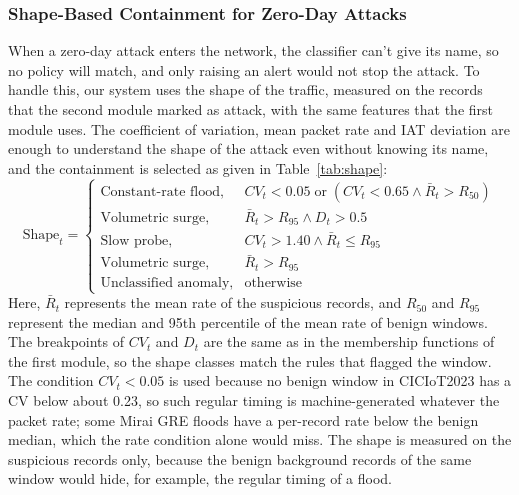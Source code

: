 \documentclass[]{interact}
\theoremstyle{plain}%
\theoremstyle{definition}
\theoremstyle{remark}
\begin{document}
\subsubsection{Shape-Based Containment for Zero-Day Attacks}
When a zero-day attack enters the network, the classifier can't give its name, so no policy will match, and only raising an alert would not stop the attack. To handle this, our system uses the shape of the traffic, measured on the records that the second module marked as attack, with the same features that the first module uses. The coefficient of variation, mean packet rate and IAT deviation are enough to understand the shape of the attack even without knowing its name, and the containment is selected as given in Table~\ref{tab:shape}:
\begin{equation}
  \text{Shape}_t =
  \begin{cases}
    \text{Constant-rate flood}, & CV_t < 0.05 \;\text{or}\; \left(CV_t < 0.65 \wedge \bar{R}_t > R_{50}\right)\\
    \text{Volumetric surge}, & \bar{R}_t > R_{95} \wedge D_t > 0.5\\
    \text{Slow probe}, & CV_t > 1.40 \wedge \bar{R}_t \le R_{95}\\
    \text{Volumetric surge}, & \bar{R}_t > R_{95}\\
    \text{Unclassified anomaly}, & \text{otherwise}
  \end{cases}
  \label{eq:shape}
\end{equation}
Here, $\bar{R}_t$ represents the mean rate of the suspicious records, and $R_{50}$ and $R_{95}$ represent the median and 95th percentile of the mean rate of benign windows. The breakpoints of $CV_t$ and $D_t$ are the same as in the membership functions of the first module, so the shape classes match the rules that flagged the window. The condition $CV_t < 0.05$ is used because no benign window in CICIoT2023 has a CV below about 0.23, so such regular timing is machine-generated whatever the packet rate; some Mirai GRE floods have a per-record rate below the benign median, which the rate condition alone would miss. The shape is measured on the suspicious records only, because the benign background records of the same window would hide, for example, the regular timing of a flood.
\end{document}
